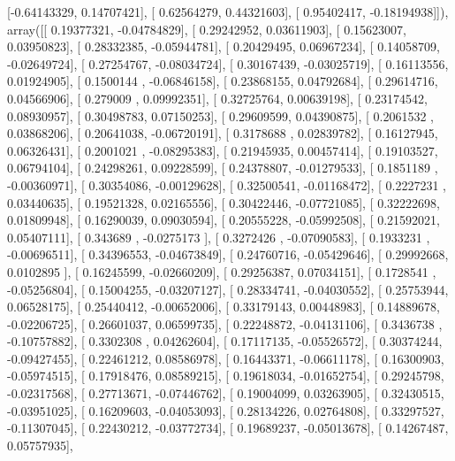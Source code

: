 \documentclass{article}
\begin{document}
       [-0.64143329,  0.14707421],
       [ 0.62564279,  0.44321603],
       [ 0.95402417, -0.18194938]]), array([[ 0.19377321, -0.04784829],
       [ 0.29242952,  0.03611903],
       [ 0.15623007,  0.03950823],
       [ 0.28332385, -0.05944781],
       [ 0.20429495,  0.06967234],
       [ 0.14058709, -0.02649724],
       [ 0.27254767, -0.08034724],
       [ 0.30167439, -0.03025719],
       [ 0.16113556,  0.01924905],
       [ 0.1500144 , -0.06846158],
       [ 0.23868155,  0.04792684],
       [ 0.29614716,  0.04566906],
       [ 0.279009  ,  0.09992351],
       [ 0.32725764,  0.00639198],
       [ 0.23174542,  0.08930957],
       [ 0.30498783,  0.07150253],
       [ 0.29609599,  0.04390875],
       [ 0.2061532 ,  0.03868206],
       [ 0.20641038, -0.06720191],
       [ 0.3178688 ,  0.02839782],
       [ 0.16127945,  0.06326431],
       [ 0.2001021 , -0.08295383],
       [ 0.21945935,  0.00457414],
       [ 0.19103527,  0.06794104],
       [ 0.24298261,  0.09228599],
       [ 0.24378807, -0.01279533],
       [ 0.1851189 , -0.00360971],
       [ 0.30354086, -0.00129628],
       [ 0.32500541, -0.01168472],
       [ 0.2227231 ,  0.03440635],
       [ 0.19521328,  0.02165556],
       [ 0.30422446, -0.07721085],
       [ 0.32222698,  0.01809948],
       [ 0.16290039,  0.09030594],
       [ 0.20555228, -0.05992508],
       [ 0.21592021,  0.05407111],
       [ 0.343689  , -0.0275173 ],
       [ 0.3272426 , -0.07090583],
       [ 0.1933231 , -0.00696511],
       [ 0.34396553, -0.04673849],
       [ 0.24760716, -0.05429646],
       [ 0.29992668,  0.0102895 ],
       [ 0.16245599, -0.02660209],
       [ 0.29256387,  0.07034151],
       [ 0.1728541 , -0.05256804],
       [ 0.15004255, -0.03207127],
       [ 0.28334741, -0.04030552],
       [ 0.25753944,  0.06528175],
       [ 0.25440412, -0.00652006],
       [ 0.33179143,  0.00448983],
       [ 0.14889678, -0.02206725],
       [ 0.26601037,  0.06599735],
       [ 0.22248872, -0.04131106],
       [ 0.3436738 , -0.10757882],
       [ 0.3302308 ,  0.04262604],
       [ 0.17117135, -0.05526572],
       [ 0.30374244, -0.09427455],
       [ 0.22461212,  0.08586978],
       [ 0.16443371, -0.06611178],
       [ 0.16300903, -0.05974515],
       [ 0.17918476,  0.08589215],
       [ 0.19618034, -0.01652754],
       [ 0.29245798, -0.02317568],
       [ 0.27713671, -0.07446762],
       [ 0.19004099,  0.03263905],
       [ 0.32430515, -0.03951025],
       [ 0.16209603, -0.04053093],
       [ 0.28134226,  0.02764808],
       [ 0.33297527, -0.11307045],
       [ 0.22430212, -0.03772734],
       [ 0.19689237, -0.05013678],
       [ 0.14267487,  0.05757935],
\end{document}

